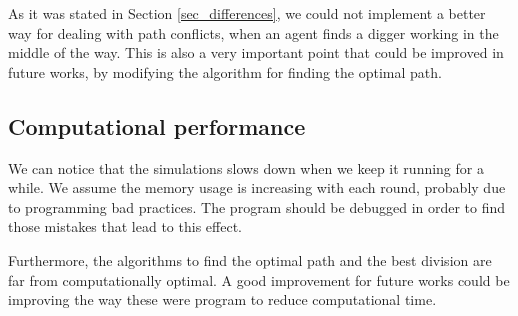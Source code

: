 As it was stated in Section \ref{sec_differences}, we could not implement a better way for dealing with path conflicts, when an agent finds a digger working in the middle of the way. This is also a very important point that could be improved in future works, by modifying the algorithm for finding the optimal path. 

\subsection{Computational performance}

We can notice that the simulations slows down when we keep it running for a while. We assume the memory usage is increasing with each round, probably due to programming bad practices. The program should be debugged in order to find those mistakes that lead to this effect. 

Furthermore, the algorithms to find the optimal path and the best division are far from computationally optimal. A good improvement for future works could be improving the way these were program to reduce computational time. 